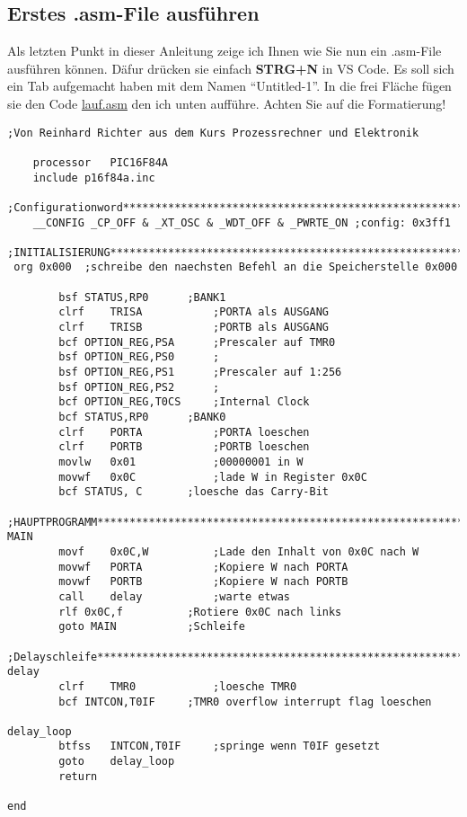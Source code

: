 \subsection{Erstes .asm-File ausführen}
Als letzten Punkt in dieser Anleitung zeige ich Ihnen wie Sie nun ein {\ttfamily .asm}-File ausführen können. Däfur drücken sie einfach \textbf{STRG+N} in VS Code. Es soll sich ein Tab aufgemacht haben mit dem Namen \enquote{Untitled-1}. In die frei Fläche fügen sie den Code \href{https://github.com/ManeLippert/AssemblerVSCode/blob/master/lauf.asm}{\ttfamily lauf.asm} den ich unten aufführe. Achten Sie auf die Formatierung!
\begin{lstlisting}[language={[x86masm]Assembler}]
;Von Reinhard Richter aus dem Kurs Prozessrechner und Elektronik

    processor	PIC16F84A
    include	p16f84a.inc

;Configurationword*************************************************************
    __CONFIG _CP_OFF & _XT_OSC & _WDT_OFF & _PWRTE_ON ;config: 0x3ff1

;INITIALISIERUNG***************************************************************
 org 0x000	;schreibe den naechsten Befehl an die Speicherstelle 0x000

        bsf	STATUS,RP0		;BANK1
        clrf	TRISA			;PORTA als AUSGANG
        clrf	TRISB			;PORTB als AUSGANG
        bcf	OPTION_REG,PSA		;Prescaler auf TMR0
        bsf	OPTION_REG,PS0		;
        bsf	OPTION_REG,PS1		;Prescaler auf 1:256
        bsf	OPTION_REG,PS2		;
        bcf	OPTION_REG,T0CS		;Internal Clock
        bcf	STATUS,RP0		;BANK0
        clrf	PORTA			;PORTA loeschen
        clrf	PORTB			;PORTB loeschen
        movlw	0x01			;00000001 in W
        movwf	0x0C			;lade W in Register 0x0C
        bcf	STATUS, C		;loesche das Carry-Bit

;HAUPTPROGRAMM*****************************************************************
MAIN
        movf	0x0C,W			;Lade den Inhalt von 0x0C nach W
        movwf	PORTA			;Kopiere W nach PORTA
        movwf	PORTB			;Kopiere W nach PORTB
        call	delay			;warte etwas
        rlf	0x0C,f			;Rotiere 0x0C nach links
        goto MAIN			;Schleife

;Delayschleife*****************************************************************
delay
        clrf	TMR0			;loesche TMR0
        bcf	INTCON,T0IF		;TMR0 overflow interrupt flag loeschen

delay_loop
        btfss	INTCON,T0IF		;springe wenn T0IF gesetzt
        goto	delay_loop			
        return

end
\end{lstlisting}
